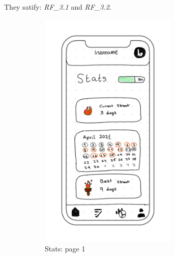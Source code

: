 They satify: \textit{RF\_3.1} and \textit{RF\_3.2}. \\
\begin{figure}[H]
    \centering
    \begin{subfigure}[T]{0.32\textwidth}
        \centering
        \includegraphics[width=0.72\textwidth]{assets/screens/stats/Stats - 1.png}
        \caption{Stats: page 1}
        \label{fig:design_screen_stats_1}
    \end{subfigure}
    \hfill
    \begin{subfigure}[T]{0.32\textwidth}
        \centering

\end{subfigure}
\end{figure}
